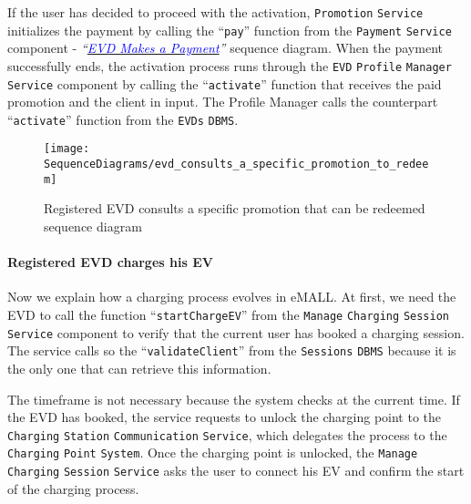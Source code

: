 If the user has decided to proceed with the activation, \verb|Promotion| \verb|Service| initializes the payment by calling the ``\verb|pay|'' function from the \verb|Payment| \verb|Service| component - \textit{``}\hyperlink{evdmakespayment}{\textcolor{blue}{\textit{EVD Makes a Payment}}}\textit{''} sequence diagram.
When the payment successfully ends, the activation process runs through the \verb|EVD| \verb|Profile| \verb|Manager| \verb|Service| component by calling the ``\verb|activate|'' function that receives the paid promotion and the client in input.
The Profile Manager calls the counterpart ``\verb|activate|'' function from the \verb|EVDs| \verb|DBMS|\@.
\begin{figure}[H]
    \begin{center}
        \texttt{[image: SequenceDiagrams/evd\_consults\_a\_specific\_promotion\_to\_redeem]}
        \caption{Registered EVD consults a specific promotion that can be redeemed sequence diagram}
        \label{fig:evd_consults_specific_promotion_to_redeem}
    \end{center}
\end{figure}

\paragraph{Registered EVD charges his EV}
Now we explain how a charging process evolves in eMALL\@.
At first, we need the EVD to call the function ``\verb|startChargeEV|'' from the \verb|Manage| \verb|Charging| \verb|Session| \verb|Service| component to verify that the current user has booked a charging session.
The service calls so the ``\verb|validateClient|'' from the \verb|Sessions| \verb|DBMS| because it is the only one that can retrieve this information.

The timeframe is not necessary because the system checks at the current time.
If the EVD has booked, the service requests to unlock the charging point to the \verb|Charging| \verb|Station| \verb|Communication| \verb|Service|, which delegates the process to the \verb|Charging| \verb|Point| \verb|System|.
Once the charging point is unlocked, the \verb|Manage| \verb|Charging| \verb|Session| \verb|Service| asks the user to connect his EV and confirm the start of the charging process.

